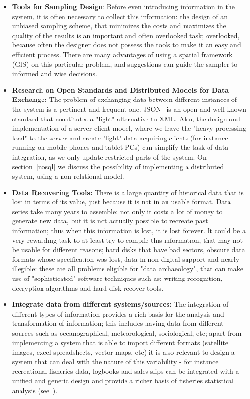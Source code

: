 \documentclass[11pt]{article} %
\begin{document}
\begin{itemize}
  \item \textbf{Tools for Sampling Design}: Before even introducing information in the system, it is often necessary to collect this information; the design of an unbiased sampling scheme, that minimizes the costs and maximizes the quality of the results is an important and often overlooked task; overlooked, because often the designer does not possess the tools to make it an easy and efficient process. There are many advantages of using a spatial framework (GIS) on this particular problem, and suggestions can guide the sampler to informed and wise decisions.
  \item \textbf{Research on Open Standards and Distributed Models for Data Exchange:} The problem of exchanging data between different instances of the system is a pertinent and frequent one. JSON~\cite{json} %
is an open and well-known standard that constitutes a "light" alternative to XML. Also, the design and implementation of a server-client model, where we leave the "heavy processing load" to the server and create "light" data acquiring clients (for instance running on mobile phones and tablet PCs) can simplify the task of data integration, as we only update restricted parts of the system. On section~\ref{nosql} we discuss the possibility of implementing a distributed system, using a non-relational model.
  \item \textbf{Data Recovering Tools:} There is a large quantity of historical data that is lost in terms of its value, just because it is not in an usable format. Data series take many years to assemble: not only it costs a lot of money to generate new data, but it is not actually possible to recreate past information; thus when this information is lost, it is lost forever. It could be a very rewarding task to at least try to compile this information, that may not be usable for different reasons; hard disks that have bad sectors, obscure data formats whose specification was lost, data in non digital support and nearly illegible: these are all problems eligible for "data archaeology", that can make use of "sophisticated" software techniques such as: writing recognition, decryption algorithms and hard-disk recover tools.
  \item \textbf{Integrate data from different systems/sources:} The integration of different types of information provides a rich basis for the analysis and transformation of information; this includes having data from different sources such as oceanographical, meteorological, sociological, etc; apart from implementing a system that is able to import different formats (satellite images, excel spreadsheets, vector maps, etc) it is also relevant to design a system that can deal with the nature of this variability - for instance recreational fisheries data, logbooks and sales slips can be integrated with a unified and generic design and provide a richer basis of fisheries statistical analysis (see~\cite{medfisis}).

\end{itemize}
\end{document}
